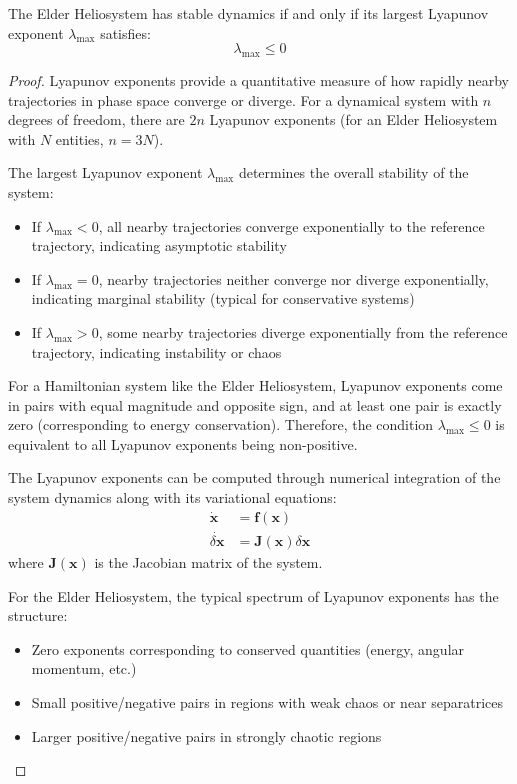 \begin{theorem}
The Elder Heliosystem has stable dynamics if and only if its largest Lyapunov exponent $\lambda_{\max}$ satisfies:
\begin{equation}
\lambda_{\max} \leq 0
\end{equation}
\end{theorem}

\begin{proof}
Lyapunov exponents provide a quantitative measure of how rapidly nearby trajectories in phase space converge or diverge. For a dynamical system with $n$ degrees of freedom, there are $2n$ Lyapunov exponents (for an Elder Heliosystem with $N$ entities, $n = 3N$).

The largest Lyapunov exponent $\lambda_{\max}$ determines the overall stability of the system:
\begin{itemize}
    \item If $\lambda_{\max} < 0$, all nearby trajectories converge exponentially to the reference trajectory, indicating asymptotic stability
    \item If $\lambda_{\max} = 0$, nearby trajectories neither converge nor diverge exponentially, indicating marginal stability (typical for conservative systems)
    \item If $\lambda_{\max} > 0$, some nearby trajectories diverge exponentially from the reference trajectory, indicating instability or chaos
\end{itemize}

For a Hamiltonian system like the Elder Heliosystem, Lyapunov exponents come in pairs with equal magnitude and opposite sign, and at least one pair is exactly zero (corresponding to energy conservation). Therefore, the condition $\lambda_{\max} \leq 0$ is equivalent to all Lyapunov exponents being non-positive.

The Lyapunov exponents can be computed through numerical integration of the system dynamics along with its variational equations:
\begin{align}
\dot{\mathbf{x}} &= \mathbf{f}(\mathbf{x}) \\
\dot{\delta\mathbf{x}} &= \mathbf{J}(\mathbf{x}) \delta\mathbf{x}
\end{align}
where $\mathbf{J}(\mathbf{x})$ is the Jacobian matrix of the system.

For the Elder Heliosystem, the typical spectrum of Lyapunov exponents has the structure:
\begin{itemize}
    \item Zero exponents corresponding to conserved quantities (energy, angular momentum, etc.)
    \item Small positive/negative pairs in regions with weak chaos or near separatrices
    \item Larger positive/negative pairs in strongly chaotic regions
\end{itemize}


\end{proof}
